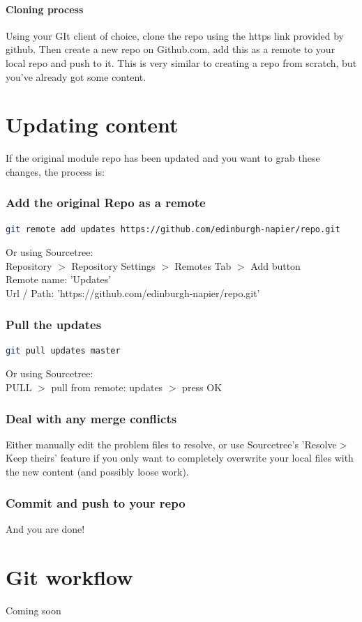 \documentclass[11pt, a4paper]{article}
\begin{document}
	\paragraph{Cloning process}
	Using your GIt client of choice, clone the repo using the https link provided by github. Then create a new repo on Github.com, add this as a remote to your local repo and push to it. This is very similar to creating a repo from scratch, but you've already got some content.
	
	\section{Updating content}
	If the original module repo has been updated and you want to grab these changes, the process is:
	\subsubsection{Add the original Repo as a remote}
		\begin{lstlisting}[caption = gitbash ADD REMOTE command,  language=bash]
			git remote add updates https://github.com/edinburgh-napier/repo.git
		\end{lstlisting}
		Or using Sourcetree:\\
		Repository $>$ Repository Settings $>$ Remotes Tab $>$ Add button\\
		Remote name: 'Updates'\\
		Url / Path:  'https://github.com/edinburgh-napier/repo.git'
	
	\subsubsection{Pull the updates}
		\begin{lstlisting}[caption = gitbash PULL command,  language=bash]
		git pull updates master
		\end{lstlisting}
		Or using Sourcetree:\\
		PULL $>$ pull from remote: updates $>$ press OK
		
	\subsubsection{Deal with any merge conflicts}	
	Either manually edit the problem files to resolve, or use Sourcetree's 'Resolve$>$Keep theirs' feature if you only want to completely overwrite your local files with the new content (and possibly loose work).
	\subsubsection{Commit and push to your repo}	
	And you are done!
	
	\clearpage
    \section{Git workflow}
	    Coming soon
\end{document}
